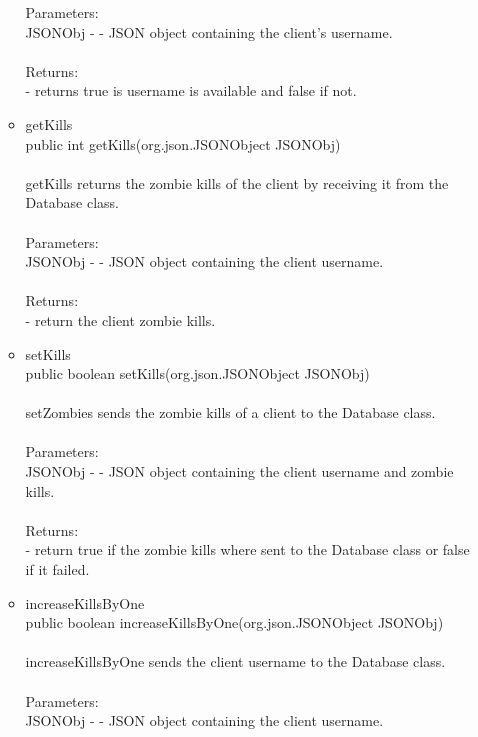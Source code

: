 \documentclass[letterpaper]{article}
\begin{document}
\begin{itemize}
\begin{itemize}
											Parameters: \\
											JSONObj - - JSON object containing the client's username. \\ \\
											Returns: \\
											- returns true is username is available and false if not.
									\item	getKills \\
											public int getKills(org.json.JSONObject JSONObj) \\ \\
											getKills returns the zombie kills of the client by receiving it from the Database class. \\ \\
											Parameters: \\
											JSONObj - - JSON object containing the client username. \\ \\
											Returns: \\
											- return the client zombie kills.
									\item	setKills \\
											public boolean setKills(org.json.JSONObject JSONObj) \\ \\
											setZombies sends the zombie kills of a client to the Database class. \\ \\
											Parameters: \\
											JSONObj - - JSON object containing the client username and zombie kills. \\ \\
											Returns: \\
											- return true if the zombie kills where sent to the Database class or false if it failed.
									\item	increaseKillsByOne \\
											public boolean increaseKillsByOne(org.json.JSONObject JSONObj) \\ \\
											increaseKillsByOne sends the client username to the Database class. \\ \\
											Parameters: \\
											JSONObj - - JSON object containing the client username. \\ \\

\end{itemize}
\end{itemize}
\end{document}
